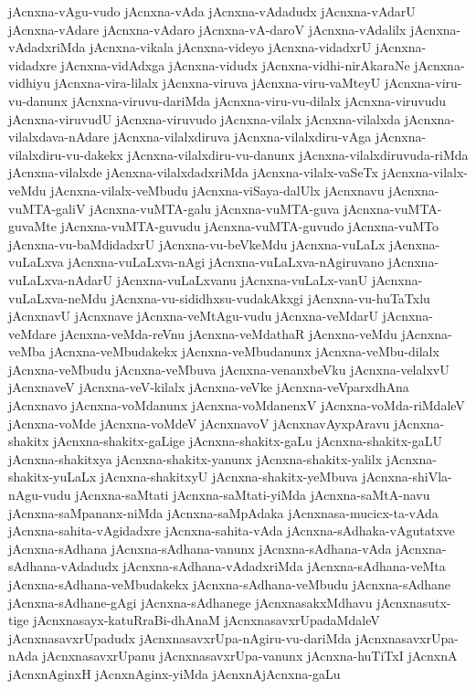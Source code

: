 {jAcnxna-vAgu-vudo
jAcnxna-vAda
jAcnxna-vAdadudx
jAcnxna-vAdarU
jAcnxna-vAdare
jAcnxna-vAdaro
jAcnxna-vA-daroV
jAcnxna-vAdalilx
jAcnxna-vAdadxriMda
jAcnxna-vikala
jAcnxna-videyo
jAcnxna-vidadxrU
jAcnxna-vidadxre
jAcnxna-vidAdxga
jAcnxna-vidudx
jAcnxna-vidhi-nirAkaraNe
jAcnxna-vidhiyu
jAcnxna-vira-lilalx
jAcnxna-viruva
jAcnxna-viru-vaMteyU
jAcnxna-viru-vu-danunx
jAcnxna-viruvu-dariMda
jAcnxna-viru-vu-dilalx
jAcnxna-viruvudu
jAcnxna-viruvudU
jAcnxna-viruvudo
jAcnxna-vilalx
jAcnxna-vilalxda
jAcnxna-vilalxdava-nAdare
jAcnxna-vilalxdiruva
jAcnxna-vilalxdiru-vAga
jAcnxna-vilalxdiru-vu-dakekx
jAcnxna-vilalxdiru-vu-danunx
jAcnxna-vilalxdiruvuda-riMda
jAcnxna-vilalxde
jAcnxna-vilalxdadxriMda
jAcnxna-vilalx-vaSeTx
jAcnxna-vilalx-veMdu
jAcnxna-vilalx-veMbudu
jAcnxna-viSaya-dalUlx
jAcnxnavu
jAcnxna-vuMTA-galiV
jAcnxna-vuMTA-galu
jAcnxna-vuMTA-guva
jAcnxna-vuMTA-guvaMte
jAcnxna-vuMTA-guvudu
jAcnxna-vuMTA-guvudo
jAcnxna-vuMTo
jAcnxna-vu-baMdidadxrU
jAcnxna-vu-beVkeMdu
jAcnxna-vuLaLx
jAcnxna-vuLaLxva
jAcnxna-vuLaLxva-nAgi
jAcnxna-vuLaLxva-nAgiruvano
jAcnxna-vuLaLxva-nAdarU
jAcnxna-vuLaLxvanu
jAcnxna-vuLaLx-vanU
jAcnxna-vuLaLxva-neMdu
jAcnxna-vu-sididhxsu-vudakAkxgi
jAcnxna-vu-huTaTxlu
jAcnxnavU
jAcnxnave
jAcnxna-veMtAgu-vudu
jAcnxna-veMdarU
jAcnxna-veMdare
jAcnxna-veMda-reVnu
jAcnxna-veMdathaR
jAcnxna-veMdu
jAcnxna-veMba
jAcnxna-veMbudakekx
jAcnxna-veMbudanunx
jAcnxna-veMbu-dilalx
jAcnxna-veMbudu
jAcnxna-veMbuva
jAcnxna-venanxbeVku
jAcnxna-velalxvU
jAcnxnaveV
jAcnxna-veV-kilalx
jAcnxna-veVke
jAcnxna-veVparxdhAna
jAcnxnavo
jAcnxna-voMdanunx
jAcnxna-voMdanenxV
jAcnxna-voMda-riMdaleV
jAcnxna-voMde
jAcnxna-voMdeV
jAcnxnavoV
jAcnxnavAyxpAravu
jAcnxna-shakitx
jAcnxna-shakitx-gaLige
jAcnxna-shakitx-gaLu
jAcnxna-shakitx-gaLU
jAcnxna-shakitxya
jAcnxna-shakitx-yanunx
jAcnxna-shakitx-yalilx
jAcnxna-shakitx-yuLaLx
jAcnxna-shakitxyU
jAcnxna-shakitx-yeMbuva
jAcnxna-shiVla-nAgu-vudu
jAcnxna-saMtati
jAcnxna-saMtati-yiMda
jAcnxna-saMtA-navu
jAcnxna-saMpananx-niMda
jAcnxna-saMpAdaka
jAcnxnasa-mucicx-ta-vAda
jAcnxna-sahita-vAgidadxre
jAcnxna-sahita-vAda
jAcnxna-sAdhaka-vAgutatxve
jAcnxna-sAdhana
jAcnxna-sAdhana-vanunx
jAcnxna-sAdhana-vAda
jAcnxna-sAdhana-vAdadudx
jAcnxna-sAdhana-vAdadxriMda
jAcnxna-sAdhana-veMta
jAcnxna-sAdhana-veMbudakekx
jAcnxna-sAdhana-veMbudu
jAcnxna-sAdhane
jAcnxna-sAdhane-gAgi
jAcnxna-sAdhanege
jAcnxnasakxMdhavu
jAcnxnasutx-tige
jAcnxnasayx-katuRraBi-dhAnaM
jAcnxnasavxrUpadaMdaleV
jAcnxnasavxrUpadudx
jAcnxnasavxrUpa-nAgiru-vu-dariMda
jAcnxnasavxrUpa-nAda
jAcnxnasavxrUpanu
jAcnxnasavxrUpa-vanunx
jAcnxna-huTiTxI
jAcnxnA
jAcnxnAginxH
jAcnxnAginx-yiMda
jAcnxnAjAcnxna-gaLu
}

